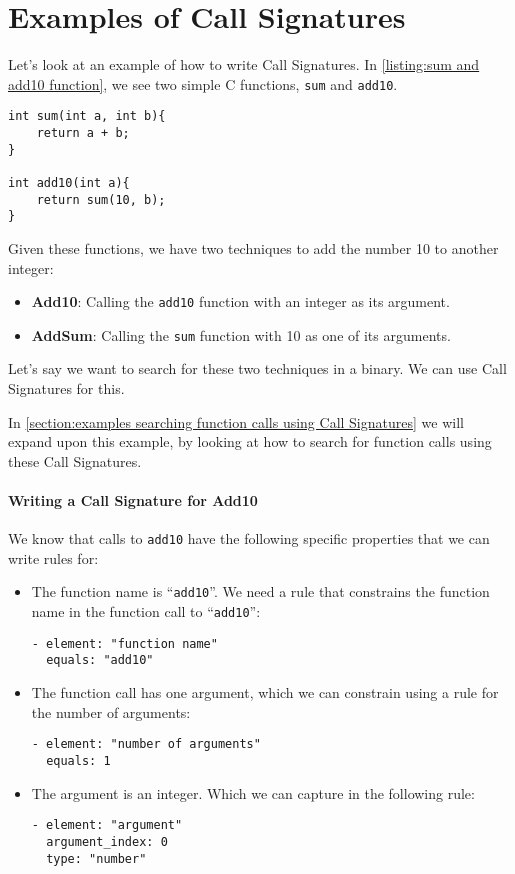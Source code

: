 \section{Examples of Call Signatures}\label{section:call signatures examples}
Let's look at an example of how to write Call Signatures. In \autoref{listing:sum and add10 function}, we see two simple C functions, \texttt{sum} and \texttt{add10}.

\begin{lstlisting}[label={listing:sum and add10 function}, caption={Two C functions.}, captionpos=b]
int sum(int a, int b){
    return a + b;
}

int add10(int a){
    return sum(10, b);
}
\end{lstlisting}

Given these functions, we have two techniques to add the number 10 to another integer:
\begin{itemize}
    \item \textbf{Add10}: Calling the \texttt{add10} function with an integer as its argument.

    \item \textbf{AddSum}: Calling the \texttt{sum} function with 10 as one of its arguments.
\end{itemize}

Let's say we want to search for these two techniques in a binary. We can use Call Signatures for this.

In \autoref{section:examples searching function calls using Call Signatures} we will expand upon this example, by looking at how to search for function calls using these Call Signatures.

\paragraph{Writing a Call Signature for Add10}

We know that calls to \texttt{add10} have the following specific properties that we can write rules for:
\begin{itemize}
    \item The function name is ``\texttt{add10}''. We need a rule that constrains the function name in the function call to ``\texttt{add10}'':
\begin{lstlisting}[captionpos=b]
- element: "function name"
  equals: "add10"
\end{lstlisting}

    \item The function call has one argument, which we can constrain using a rule for the number of arguments:
\begin{lstlisting}[captionpos=b]
- element: "number of arguments"
  equals: 1
\end{lstlisting}

    \item The argument is an integer. Which we can capture in the following rule:
\begin{lstlisting}[captionpos=b]
- element: "argument"
  argument_index: 0
  type: "number"
\end{lstlisting}

\end{itemize}

